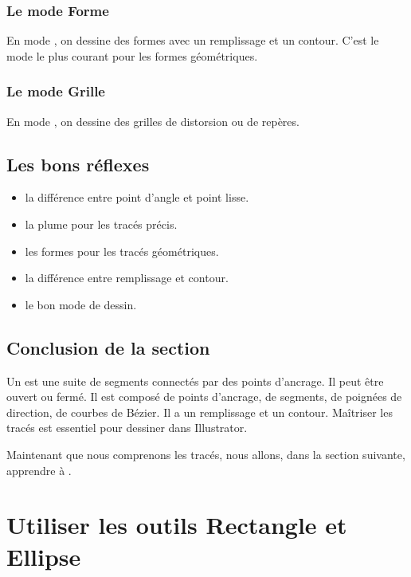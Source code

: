 \subsubsection{Le mode Forme}

En mode , on dessine des formes avec un remplissage et un contour. C'est le mode le plus courant pour les formes géométriques.

\subsubsection{Le mode Grille}

En mode , on dessine des grilles de distorsion ou de repères.

\subsection{Les bons réflexes}

\begin{itemize}
    \item {} la différence entre point d'angle et point lisse.
    \item {} la plume pour les tracés précis.
    \item {} les formes pour les tracés géométriques.
    \item {} la différence entre remplissage et contour.
    \item {} le bon mode de dessin.
\end{itemize}

\subsection*{Conclusion de la section}

Un  est une suite de segments connectés par des points d'ancrage. Il peut être ouvert ou fermé. Il est composé de points d'ancrage, de segments, de poignées de direction, de courbes de Bézier. Il a un remplissage et un contour. Maîtriser les tracés est essentiel pour dessiner dans Illustrator.

Maintenant que nous comprenons les tracés, nous allons, dans la section suivante, apprendre à .

\section{Utiliser les outils Rectangle et Ellipse}

